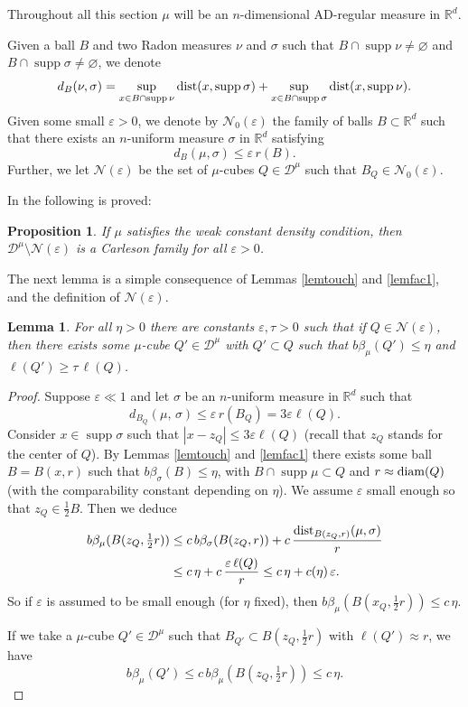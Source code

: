 \documentclass[11pt]{amsart}
\newcommand{\R}{{\mathbb R}}       %
\newcommand{\DD}{{\mathcal D}}
\newcommand{\NN}{{\mathcal N}}
\newcommand{\diam}{{\rm diam}}
\newcommand{\dist}{{\rm dist}}
\newcommand{\supp}{\operatorname{supp}}
\newcommand{\ve}{{\varepsilon}}
\newtheorem{lemma}[theorem]{Lemma}
\newtheorem{propo}[theorem]{Proposition}
\theoremstyle{definition}
\theoremstyle{remark}
\numberwithin{equation}{section}
\begin{document}
Throughout all this section $\mu$ will be an $n$-dimensional AD-regular measure in $\R^d$.

Given a ball $B$ and two Radon measures $\nu$ and $\sigma$ such that $B\cap\supp\nu\neq \varnothing $ and
$B\cap\supp\sigma\neq \varnothing $, we denote
$$d_B(\nu,\sigma) = \sup_{x\in B\cap\supp\nu} \dist(x,\supp\sigma)
+ \sup_{x\in B\cap\supp\sigma} \dist(x,\supp\nu).$$
Given some small $\ve>0$, we denote by $\NN_0(\ve)$ the family of balls $B\subset\R^d$ 
such that there exists
an $n$-uniform measure $\sigma$ in $\R^d$ satisfying
$$d_B(\mu,\sigma)\leq \ve\,r(B).$$
Further, we let $\NN(\ve)$ be the
set of $\mu$-cubes $Q \in\DD^\mu$ such that $B_Q\in\NN_0(\ve)$.

In \cite[Chapter III.5]{DS} the following is proved:

\begin{propo}\label{popofac}
If $\mu$ satisfies the weak constant density condition, then $\DD^\mu\setminus\NN(\ve)$ is a Carleson
family for all $\ve>0$.
\end{propo}


The next lemma is a simple consequence of Lemmas \ref{lemtouch} and \ref{lemfac1}, and the definition of $\NN(\ve)$.

\begin{lemma}\label{lem9}
For all $\eta>0$ there are constants $\ve,\tau>0$ such that if $Q\in\NN(\ve)$, then there exists some
$\mu$-cube $Q'\in\DD^\mu$ with $Q'\subset Q$ such that $b\beta_\mu(Q')\leq\eta$ and $\ell(Q')\geq\tau\,\ell(Q)$.
\end{lemma}

\begin{proof}
Suppose $\ve\ll1$ and let $\sigma$ be an $n$-uniform measure
in $\R^d$ such that 
$$d_{B_Q}(\mu,\,\sigma)\leq \ve\,r(B_Q)=3\ve\ell(Q).$$
Consider $x\in\supp\sigma$ such that $|x-z_Q|\leq3\ve\ell(Q)$ (recall that $z_Q$ stands for the center of $Q$). 
By Lemmas \ref{lemtouch} and \ref{lemfac1} there exists some ball $B=B(x,r)$ such that $b\beta_\sigma(B)\leq \eta$, 
with $B\cap \supp\mu\subset Q$ 
and $r\approx\diam(Q)$ (with the comparability constant depending on $\eta$).
We assume $\ve$ small enough so that $z_Q\in \frac12 B$.
Then we deduce 
\begin{align*}
b\beta_\mu(B(z_Q,\tfrac12r))& \leq c\,b\beta_\sigma(B(z_Q,r)) + c\,\frac{\dist_{B(z_Q,r)}(\mu,\sigma)}r\\
&\leq c\,\eta + c\,\frac{\ve\,\ell(Q)}{r}\leq c\,\eta + c(\eta)\,\ve.
\end{align*}
So if $\ve$ is assumed to be small enough (for $\eta$ fixed), then $b\beta_\mu(B(x_Q,\frac12r))\leq c\,\eta$.

If we take a $\mu$-cube $Q'\in\DD^\mu$ such that $B_{Q'}\subset B(z_Q,\frac12r)$ with $\ell(Q')\approx r$, we have
$$b\beta_\mu(Q')\leq c\,b\beta_\mu(B(z_Q,\tfrac12r))\leq c\,\eta.$$
\end{proof}
\end{document}
